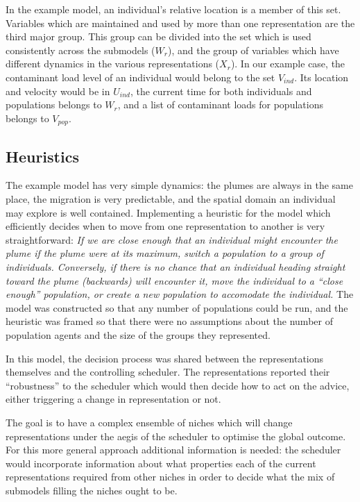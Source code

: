 In the example model, an individual's relative location is a member of this
set. Variables which are maintained and used by more than one representation
are the third major group. This group can be divided into the set which is
used consistently across the submodels ($W_r$), and the group of variables
which have different dynamics in the various representations ($X_r$). In our
example case, the contaminant load level of an individual would belong to the
set $V_{{ind}}$. Its location and velocity would be in $U_{{ind}}$,
the current time for both individuals and populations belongs to $W_r$, and a
list of contaminant loads for populations belongs to $V_{{pop}}$.



\subsection{Heuristics}

The example model has very simple dynamics: the plumes are always in the same
place, the migration is very predictable, and the spatial domain an individual
may explore is well contained. Implementing a heuristic for the model which
efficiently decides when to move from one representation to another is very
straightforward: {\em{If we are close enough that an individual might
encounter the plume if the plume were at its maximum, switch a population to a
group of individuals. Conversely, if there is no chance that an individual
heading straight toward the plume (backwards) will encounter it, move the
individual to a ``close enough'' population, or create a new population to
accomodate the individual.}} The model was constructed so that any number of
populations could be run, and the heuristic was framed so that there were no
assumptions about the number of population agents and the size of the groups
they represented.

In this model, the decision process was shared between the representations
themselves and the controlling scheduler.\label{Heuristics} The
representations reported their ``robustness'' to the scheduler which would
then decide how to act on the advice, either triggering a change in
representation or not.

The goal is to have a complex ensemble of niches which will change
representations under the aegis of the scheduler to optimise the global
outcome. For this more general approach additional information is needed: the
scheduler would incorporate information about what properties each of the
current representations required from other niches in order to decide what the
mix of submodels filling the niches ought to be.

